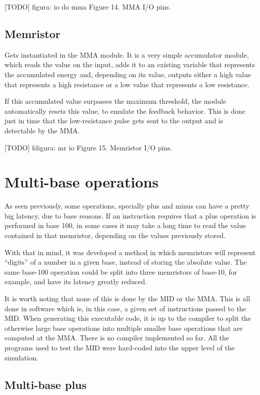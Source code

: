 \documentclass[ecp,tc,english]{iiufrgs}
\begin{document}
[TODO] figura: io do mma
Figure 14. MMA I/O pins.

\section{Memristor}

Gets instantiated in the MMA module. It is a very simple accumulator module, which reads the value on the input, adds it to an existing variable that represents the accumulated energy and, depending on its value, outputs either a high value that represents a high resistance or a low value that represents a low resistance.

If this accumulated value surpasses the maximum threshold, the module automatically resets this value, to emulate the feedback behavior. This is done just in time that the low-resistance pulse gets sent to the output and is detectable by the MMA.

[TODO] fdigura: mr io
Figure 15. Memristor I/O pins.

\chapter{Multi-base operations}

As seen previously, some operations, specially plus and minus can have a pretty big latency, due to base reasons. If an instruction requires that a plus operation is performed in base 100, in some cases it may take a long time to read the value contained in that memristor, depending on the values previously stored.

With that in mind, it was developed a method in which memristors will represent “digits” of a number in a given base, instead of storing the absolute value. The same base-100 operation could be split into three memristors of base-10, for example, and have its latency greatly reduced.

It is worth noting that none of this is done by the MID or the MMA. This is all done in software which is, in this case, a given set of instructions passed to the MID. When generating this executable code, it is up to the compiler to split the otherwise large base operations into multiple smaller base operations that are computed at the MMA. There is no compiler implemented so far. All the programs used to test the MID were hard-coded into the upper level of the simulation.

\section{Multi-base plus}
\end{document}
